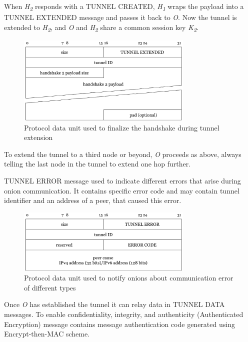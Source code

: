 \documentclass{article}
\begin{document}
When \textit{H\textsubscript{2}} responds with a TUNNEL CREATED, \textit{H\textsubscript{1}} wraps the payload into a TUNNEL EXTENDED message and passes it back to \textit{O}. Now the tunnel is extended to \textit{H\textsubscript{2}}, and \textit{O} and \textit{H\textsubscript{2}} share a common session key \textit{K\textsubscript{2}}. 
\begin{figure}[H]
\centering
     \includegraphics[width=0.75\textwidth]{msg_tunnel_extended.pdf}
      \caption{Protocol data unit used to finalize the handshake during tunnel extension}
\end{figure}

To extend the tunnel to a third node or beyond, \textit{O} proceeds as above, always telling the last node in the tunnel to extend one hop further.

TUNNEL ERROR message used to indicate different errors that arise during onion communication. It contains specific error code and may contain tunnel identifier and an address of a peer, that caused this error. 

\begin{figure}[H]
\centering
     \includegraphics[width=0.75\textwidth]{msg_tunnel_error.pdf}
      \caption{Protocol data unit used to notify onions about communication error of different types}
\end{figure}

Once \textit{O} has established the tunnel it can relay data in TUNNEL DATA messages. To enable confidentiality, integrity, and authenticity (Authenticated Encryption) message contains message authentication code generated using Encrypt-then-MAC scheme.
 
\end{document}
